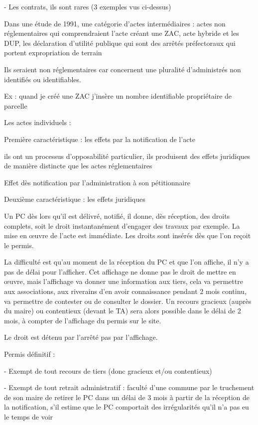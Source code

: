		-	Les contrats, ils sont rares (3 exemples vus ci-dessus)

		Dans une étude de 1991, une catégorie d’actes intermédiaires : actes non réglementaires qui comprendraient l’acte créant une ZAC, acte hybride et les DUP, les déclaration d’utilité publique qui sont des arrêtés préfectoraux qui portent expropriation de terrain

		Ils seraient non réglementaires car concernent une pluralité d’administrés non identifiés ou identifiables.

		Ex : quand je créé une ZAC j’insère un nombre identifiable propriétaire de parcelle

		
		Les actes individuels : 

		Première caractéristique : les effets par la notification de l’acte

		ils ont un processus d’opposabilité particulier, ils produisent des effets juridiques de manière distincte que les actes réglementaires

		Effet dès notification par l’administration à son pétitionnaire

		Deuxième caractéristique : les effets juridiques

		Un PC dès lors qu’il est délivré, notifié, il donne, dès réception, des droits complets, soit le droit instantanément d’engager des travaux par exemple. La mise en œuvre de l’acte est immédiate. Les droits sont insérés dès que l’on reçoit le permis.

		La difficulté est qu’au moment de la réception du PC et que l’on affiche, il n’y a pas de délai pour l’afficher. Cet affichage ne donne pas le droit de mettre en œuvre, mais l’affichage va donner une information aux tiers, cela va permettre aux associations, aux riverains d’en avoir connaissance pendant 2 mois continu, va permettre de contester ou de consulter le dossier. Un recours gracieux (auprès du maire) ou contentieux (devant le TA) sera alors possible dans le délai de 2 mois, à compter de l’affichage du permis sur le site.

		Le droit est détenu par l’arrêté pas par l’affichage.

		Permis définitif : 

		-	Exempt de tout recours de tiers (donc gracieux et/ou contentieux)

		-	Exempt de tout retrait administratif : faculté d’une commune par le truchement de son maire de retirer le PC dans un délai de 3 mois à partir de la réception de la notification, s’il estime que le PC comportait des irrégularités qu’il n’a pas eu le temps de voir

